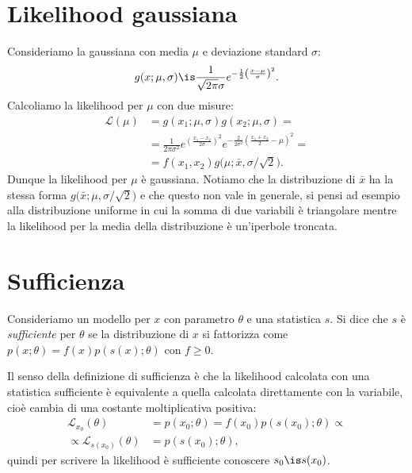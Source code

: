 \section{Likelihood gaussiana}

Consideriamo la gaussiana con media $\mu$ e deviazione standard $\sigma$:
\begin{equation*}
	g(x;\mu,\sigma) \is \frac1{\sqrt{2\pi}\sigma} e^{-\frac12 \left( \frac{x-\mu}\sigma \right)^2}.
\end{equation*}
Calcoliamo la likelihood per $\mu$ con due misure:
\begin{align*}
	\mathcal L(\mu)
	&= g(x_1;\mu,\sigma) g(x_2;\mu,\sigma) = \\
	&= \frac1{2\pi\sigma^2}
	e^{\left( \frac{x_1-x_2}{2\sigma} \right)^2}
	e^{-\frac2{2\sigma^2} \left( \frac{x_1+x_2}2 - \mu \right)^2} = \\
	&= f(x_1,x_2) g \big( \mu;\bar x,\sigma/\sqrt2 \big).
\end{align*}
Dunque la likelihood per $\mu$ è gaussiana.
Notiamo che la distribuzione di $\bar x$ ha la stessa forma $g \big( \bar x;\mu,\sigma/\sqrt2 \big)$
e che questo non vale in generale, si pensi ad esempio alla distribuzione uniforme
in cui la somma di due variabili è triangolare mentre la likelihood per la media della distribuzione è un'iperbole troncata.

\section{Sufficienza}

\begin{definition}[Sufficienza]
	\label{th:suff}
	Consideriamo un modello per $x$ con parametro $\theta$ e una statistica $s$.
	Si dice che $s$ è \emph{sufficiente} per $\theta$ se la distribuzione di $x$ si fattorizza come
	$p(x;\theta) = f(x) p(s(x);\theta)$ con $f\ge0$.
\end{definition}

Il senso della definizione di sufficienza
è che la likelihood calcolata con una statistica sufficiente
è equivalente a quella calcolata direttamente con la variabile,
cioè cambia di una costante moltiplicativa positiva:
\begin{align*}
	\mathcal L_{x_0}(\theta)
	&= p(x_0;\theta) = f(x_0) p(s(x_0);\theta) \propto \\
	\propto \mathcal L_{s(x_0)}(\theta)
	&= p(s(x_0);\theta),
\end{align*}
quindi per scrivere la likelihood è sufficiente conoscere $s_0 \is s(x_0)$.

